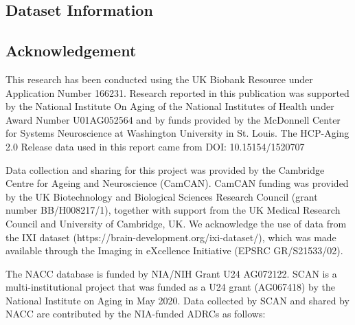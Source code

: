 \documentclass[pdflatex,sn-nature]{sn-jnl}%
\theoremstyle{thmstyleone}%
\theoremstyle{thmstyletwo}%
\theoremstyle{thmstylethree}%
\begin{document}

\begin{appendices}

\section{Dataset Information}\label{sec:datasets}
\subsection{Acknowledgement}
\label{sec_app:acknowledgement}
This research has been conducted using the UK Biobank Resource under Application Number 166231.
Research reported in this publication was supported by the National Institute On Aging of the National Institutes of Health under Award Number U01AG052564 and by funds provided by the McDonnell Center for Systems Neuroscience at Washington University in St. Louis. The HCP-Aging 2.0 Release data used in this report came from DOI: 10.15154/1520707

Data collection and sharing for this project was provided by the Cambridge Centre for Ageing and Neuroscience (CamCAN). CamCAN funding was provided by the UK Biotechnology and Biological Sciences Research Council (grant number BB/H008217/1), together with support from the UK Medical Research Council and University of Cambridge, UK.
We acknowledge the use of data from the IXI dataset (https://brain-development.org/ixi-dataset/), which was made available through the Imaging in eXcellence Initiative (EPSRC GR/S21533/02).

The NACC database is funded by NIA/NIH Grant U24 AG072122. SCAN is a multi-institutional project that was funded as a U24 grant (AG067418) by the National Institute on Aging in May 2020. Data collected by SCAN and shared by NACC are contributed by the NIA-funded ADRCs as follows:


\end{appendices}
\end{document}
